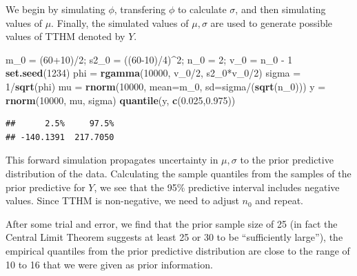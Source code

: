 \documentclass[]{book}
\newenvironment{Shaded}{\begin{snugshade}}{\end{snugshade}}
\newcommand{\KeywordTok}[1]{\textcolor[rgb]{0.13,0.29,0.53}{\textbf{{#1}}}}
\newcommand{\DataTypeTok}[1]{\textcolor[rgb]{0.13,0.29,0.53}{{#1}}}
\newcommand{\DecValTok}[1]{\textcolor[rgb]{0.00,0.00,0.81}{{#1}}}
\newcommand{\FloatTok}[1]{\textcolor[rgb]{0.00,0.00,0.81}{{#1}}}
\newcommand{\StringTok}[1]{\textcolor[rgb]{0.31,0.60,0.02}{{#1}}}
\newcommand{\NormalTok}[1]{{#1}}
\theoremstyle{definition}
\theoremstyle{definition}
\theoremstyle{definition}
\theoremstyle{remark}
\begin{document}
We begin by simulating \(\phi\), transfering \(\phi\) to calculate
\(\sigma\), and then simulating values of \(\mu\). Finally, the
simulated values of \(\mu,\sigma\) are used to generate possible values
of TTHM denoted by \(Y\).

\begin{Shaded}
\begin{Highlighting}[]
\NormalTok{m_0 =}\StringTok{ }\NormalTok{(}\DecValTok{60+10}\NormalTok{)/}\DecValTok{2}\NormalTok{; s2_0 =}\StringTok{ }\NormalTok{((}\DecValTok{60-10}\NormalTok{)/}\DecValTok{4}\NormalTok{)^}\DecValTok{2}\NormalTok{;}
\NormalTok{n_0 =}\StringTok{ }\DecValTok{2}\NormalTok{; v_0 =}\StringTok{ }\NormalTok{n_0 -}\StringTok{ }\DecValTok{1}
\KeywordTok{set.seed}\NormalTok{(}\DecValTok{1234}\NormalTok{)}
\NormalTok{phi =}\StringTok{ }\KeywordTok{rgamma}\NormalTok{(}\DecValTok{10000}\NormalTok{, v_0/}\DecValTok{2}\NormalTok{, s2_0*v_0/}\DecValTok{2}\NormalTok{)}
\NormalTok{sigma =}\StringTok{ }\DecValTok{1}\NormalTok{/}\KeywordTok{sqrt}\NormalTok{(phi)}
\NormalTok{mu =}\StringTok{ }\KeywordTok{rnorm}\NormalTok{(}\DecValTok{10000}\NormalTok{, }\DataTypeTok{mean=}\NormalTok{m_0, }\DataTypeTok{sd=}\NormalTok{sigma/(}\KeywordTok{sqrt}\NormalTok{(n_0)))}
\NormalTok{y =}\StringTok{ }\KeywordTok{rnorm}\NormalTok{(}\DecValTok{10000}\NormalTok{, mu, sigma)}
\KeywordTok{quantile}\NormalTok{(y, }\KeywordTok{c}\NormalTok{(}\FloatTok{0.025}\NormalTok{,}\FloatTok{0.975}\NormalTok{))}
\end{Highlighting}
\end{Shaded}

\begin{verbatim}
##      2.5%     97.5% 
## -140.1391  217.7050
\end{verbatim}

This forward simulation propagates uncertainty in \(\mu,\sigma\) to the
prior predictive distribution of the data. Calculating the sample
quantiles from the samples of the prior predictive for \(Y\), we see
that the 95\% predictive interval includes negative values. Since TTHM
is non-negative, we need to adjust \(n_0\) and repeat.

After some trial and error, we find that the prior sample size of 25 (in
fact the Central Limit Theorem suggests at least 25 or 30 to be
``sufficiently large''), the empirical quantiles from the prior
predictive distribution are close to the range of 10 to 16 that we were
given as prior information.
\end{document}
